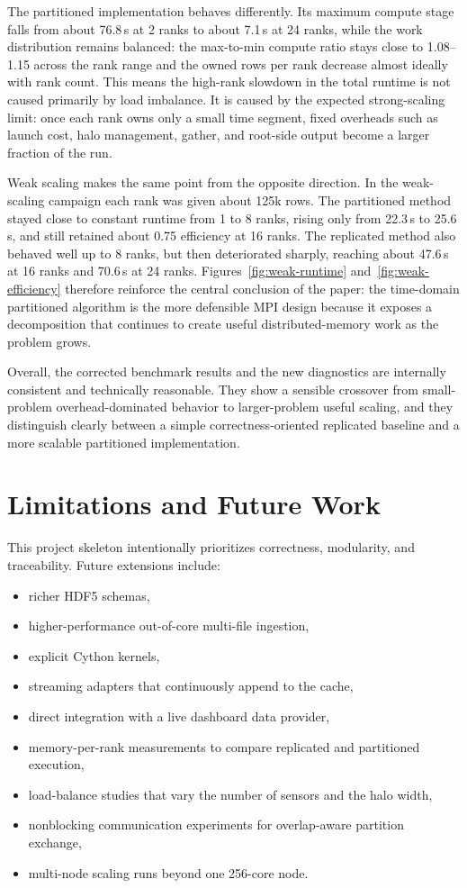\documentclass[11pt]{article}
\begin{document}
The partitioned implementation behaves differently. Its maximum compute stage falls from about 76.8\,s at 2 ranks to about 7.1\,s at 24 ranks, while the work distribution remains balanced: the max-to-min compute ratio stays close to 1.08--1.15 across the rank range and the owned rows per rank decrease almost ideally with rank count. This means the high-rank slowdown in the total runtime is not caused primarily by load imbalance. It is caused by the expected strong-scaling limit: once each rank owns only a small time segment, fixed overheads such as launch cost, halo management, gather, and root-side output become a larger fraction of the run.

Weak scaling makes the same point from the opposite direction. In the weak-scaling campaign each rank was given about 125k rows. The partitioned method stayed close to constant runtime from 1 to 8 ranks, rising only from 22.3\,s to 25.6\,s, and still retained about 0.75 efficiency at 16 ranks. The replicated method also behaved well up to 8 ranks, but then deteriorated sharply, reaching about 47.6\,s at 16 ranks and 70.6\,s at 24 ranks. Figures~\ref{fig:weak-runtime} and~\ref{fig:weak-efficiency} therefore reinforce the central conclusion of the paper: the time-domain partitioned algorithm is the more defensible MPI design because it exposes a decomposition that continues to create useful distributed-memory work as the problem grows.

Overall, the corrected benchmark results and the new diagnostics are internally consistent and technically reasonable. They show a sensible crossover from small-problem overhead-dominated behavior to larger-problem useful scaling, and they distinguish clearly between a simple correctness-oriented replicated baseline and a more scalable partitioned implementation.

\section{Limitations and Future Work}
This project skeleton intentionally prioritizes correctness, modularity, and traceability. Future extensions include:
\begin{itemize}
  \item richer HDF5 schemas,
  \item higher-performance out-of-core multi-file ingestion,
  \item explicit Cython kernels,
  \item streaming adapters that continuously append to the cache,
  \item direct integration with a live dashboard data provider,
  \item memory-per-rank measurements to compare replicated and partitioned execution,
  \item load-balance studies that vary the number of sensors and the halo width,
  \item nonblocking communication experiments for overlap-aware partition exchange,
  \item multi-node scaling runs beyond one 256-core node.
\end{itemize}
\end{document}
